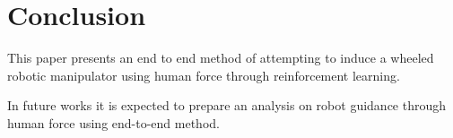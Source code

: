 \section{Conclusion}
This paper presents an end to end method of attempting to induce a wheeled robotic manipulator using human force through reinforcement learning.

In future works it is expected to prepare an analysis on robot guidance through human force using end-to-end method.
